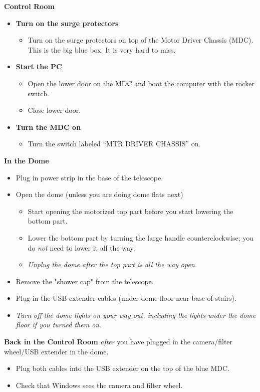 \documentclass[letterpaper, 12pt]{report}
\begin{document}
{\large\textbf{Control Room}}
\begin{itemize}
	\item \textbf{Turn on the surge protectors}
	\begin{itemize}
		\item Turn on the surge protectors on top of the Motor Driver Chassis (MDC). This is the big blue box. It is very hard to miss.
	\end{itemize}
	\item \textbf{Start the PC}
	\begin{itemize}
		\item Open the lower door on the MDC and boot the computer with the rocker switch.
		\item Close lower door.
	\end{itemize}
	\item \textbf{Turn the MDC on}
	\begin{itemize}
		\item Turn the switch labeled ``MTR DRIVER CHASSIS'' on.
	\end{itemize}
\end{itemize}

\large{\textbf{In the Dome}}
\begin{itemize}
	\item Plug in power strip in the base of the telescope.
	\item Open the dome (unless you are doing dome flats next)
	\begin{itemize}
		\item Start opening the motorized top part before you start lowering the bottom part.
		\item Lower the bottom part by turning the large handle counterclockwise; you do \emph{not} need to lower it all the way.
		\item \emph{Unplug the dome after the top part is all the way open.}
	\end{itemize}
	\item Remove the "shower cap" from the telescope.
	\item Plug in the USB extender cables (under dome floor near base of stairs).
	\item \emph{Turn off the dome lights on your way out, including the lights under the dome floor if you turned them on.}
\end{itemize}

\large{\textbf{Back in the Control Room}} \emph{after} you have plugged in the camera/filter wheel/USB extender in the dome.
\begin{itemize}
	\item Plug both cables into the USB extender on the top of the blue MDC.
	\item Check that Windows sees the camera and filter wheel.
\end{itemize}
\newpage
\end{document}
